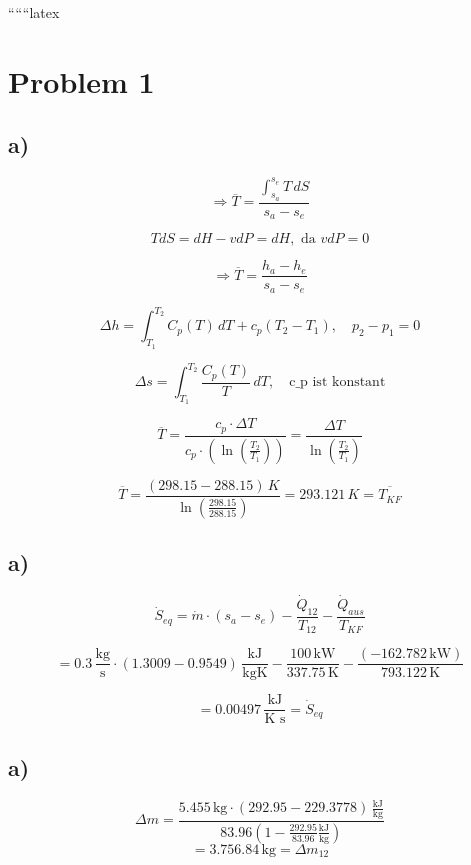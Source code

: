 ``````latex


\section*{Problem 1}



\subsection*{a)}

 \quad {}

\[
\Rightarrow \overline{T} = \frac{\int_{s_a}^{s_e} T \, dS}{s_a - s_e}
\]


\[
T dS = dH - v dP = dH, \text{ da } v dP = 0
\]

\[
\Rightarrow \overline{T} = \frac{h_a - h_e}{s_a - s_e}
\]

\[
\Delta h = \int_{T_1}^{T_2} C_p(T) \, dT + c_p(T_2 - T_1), \quad p_2 - p_1 = 0
\]

\[
\Delta s = \int_{T_1}^{T_2} \frac{C_p(T)}{T} \, dT, \quad \text{c_p ist konstant}
\]

\[
\overline{T} = \frac{c_p \cdot \Delta T}{c_p \cdot \left( \ln \left( \frac{T_2}{T_1} \right) \right)} = \frac{\Delta T}{\ln \left( \frac{T_2}{T_1} \right)}
\]

\[
\overline{T} = \frac{(298.15 - 288.15) \, K}{\ln \left( \frac{298.15}{288.15} \right)} = 293.121 \, K = \overline{T_{KF}}
\]



\subsection*{a)}

\[
\dot{S}_{eq} = \dot{m} \cdot (s_{a} - s_{e}) - \frac{\dot{Q}_{12}}{T_{12}} - \frac{\dot{Q}_{aus}}{T_{KF}}
\]

\[
= 0.3 \, \frac{\text{kg}}{\text{s}} \cdot (1.3009 - 0.9549) \, \frac{\text{kJ}}{\text{kgK}} - \frac{100 \, \text{kW}}{337.75 \, \text{K}} - \frac{(-162.782 \, \text{kW})}{793.122 \, \text{K}}
\]

\[
= 0.00497 \, \frac{\text{kJ}}{\text{K s}} = \dot{S}_{eq}
\]



\subsection*{a)}
\[
\Delta m = \frac{5.455 \, \text{kg} \cdot \left( 292.95 - 229.3778 \right) \, \frac{\text{kJ}}{\text{kg}}}{83.96 \left( 1 - \frac{292.95}{83.96} \frac{\text{kJ}}{\text{kg}} \right)}
\]
\[
= 3.756.84 \, \text{kg} = \Delta m_{12}
\]